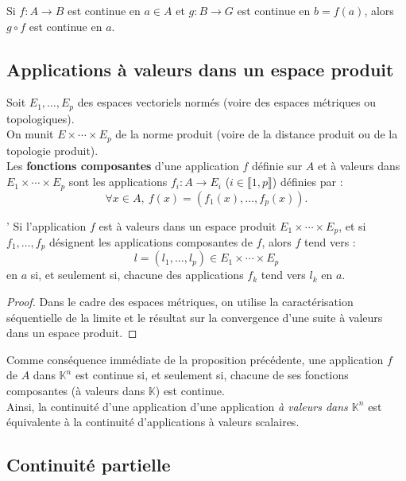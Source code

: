 \documentclass[french]{article}
\newcommand{\K}{\mathbb{K}}
\theoremstyle{plain}
\theoremstyle{definition}
\theoremstyle{remark}
\begin{document}
\begin{thm}{}%
	Si $f:A\to B$ est continue en $a\in A$ et $g:B\to G$ est continue en $b=f(a)$, alors $g\circ f$ est continue en $a$.
\end{thm}

\subsection{Applications à valeurs dans un espace produit}

Soit $E_1,\ldots,E_p$ des espaces vectoriels normés (voire des espaces métriques ou topologiques).\\
On munit $E\times\cdots\times E_p$ de la norme produit (voire de la distance produit ou de la topologie produit). \\
Les \textbf{fonctions composantes} d'une application $f$ définie sur $A$ et à valeurs dans $E_1\times\cdots\times E_p$ sont les applications $f_i:A\to E_i$ ($i\in\llbracket1,p\rrbracket$) définies par : $$\forall x\in A,\ f(x)=(f_1(x),\ldots,f_p(x)).$$

\begin{thm}'
	Si l'application $f$ est à valeurs dans un espace produit $E_1\times\cdots\times E_p$, et si $f_1,\ldots,f_p$ désignent les applications composantes de $f$, alors $f$ tend vers : $$l=(l_1,\ldots,l_p)\in E_1\times\cdots\times E_p$$ en $a$ si, et seulement si, chacune des applications $f_k$ tend vers $l_k$ en $a$.
\end{thm}
\begin{proof}
	Dans le cadre des espaces métriques, on utilise la caractérisation séquentielle de la limite et le résultat sur la convergence d'une suite à valeurs dans un espace produit.
\end{proof}

Comme conséquence immédiate de la proposition précédente, une application $f$ de $A$ dans $\K^n$ est continue si, et seulement si, chacune de ses fonctions composantes (à valeurs dans $\K$) est continue.\\
Ainsi, la continuité d'une application d'une application \textit{à valeurs dans $\K^n$} est équivalente à la continuité d'applications à valeurs scalaires.

\subsection{Continuité partielle}
\end{document}
